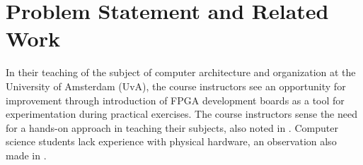 \documentclass[openright]{template/uva-bachelor-thesis}
\begin{document}





\newpage
\section{Problem Statement and Related Work}
In their teaching of the subject of computer architecture and organization at the University of Amsterdam (UvA), the course instructors see an opportunity for improvement through introduction of FPGA development boards as a tool for experimentation during practical exercises. The course instructors sense the need for a hands-on approach in teaching their subjects, also noted in \cite{cifredo2015computer, oztekin2011bzk}. Computer science students lack experience with physical hardware, an observation also made in \cite{el2011teaching}. 
\end{document}
